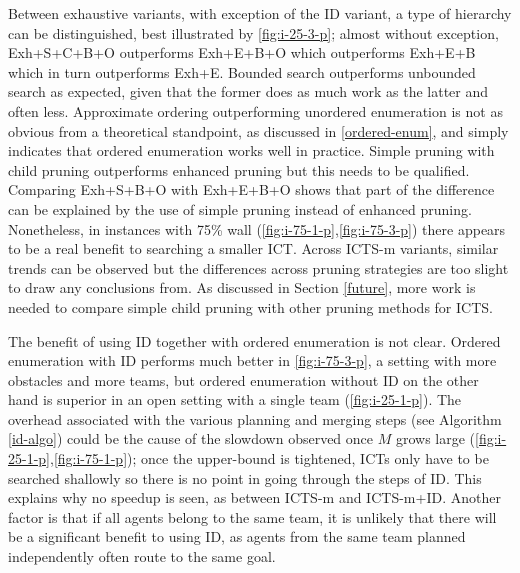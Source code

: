 \documentclass[english]{article}
\begin{document}
	Between exhaustive variants, with exception of the ID variant, a type of hierarchy can be distinguished, best illustrated by \ref{fig:i-25-3-p}; almost without exception, Exh+S+C+B+O outperforms Exh+E+B+O which outperforms Exh+E+B which in turn outperforms Exh+E. Bounded search outperforms unbounded search as expected, given that the former does as much work as the latter and often less. Approximate ordering outperforming unordered enumeration is not as obvious from a theoretical standpoint, as discussed in \ref{ordered-enum}, and simply indicates that ordered enumeration works well in practice. Simple pruning with child pruning outperforms enhanced pruning but this needs to be qualified. Comparing Exh+S+B+O with Exh+E+B+O shows that part of the difference can be explained by the use of simple pruning instead of enhanced pruning. Nonetheless, in instances with 75\% wall (\ref{fig:i-75-1-p},\ref{fig:i-75-3-p}) there appears to be a real benefit to searching a smaller ICT. Across ICTS-m variants, similar trends can be observed but the differences across pruning strategies are too slight to draw any conclusions from. As discussed in Section \ref{future}, more work is needed to compare simple child pruning with other pruning methods for ICTS.
	
	The benefit of using ID together with ordered enumeration is not clear. Ordered enumeration with ID performs much better in \ref{fig:i-75-3-p}, a setting with more obstacles and more teams, but ordered enumeration without ID on the other hand is superior in an open setting with a single team (\ref{fig:i-25-1-p}). The overhead associated with the various planning and merging steps (see Algorithm \ref{id-algo}) could be the cause of the slowdown observed once $M$ grows large (\ref{fig:i-25-1-p},\ref{fig:i-75-1-p}); once the upper-bound is tightened, ICTs only have to be searched shallowly so there is no point in going through the steps of ID. This explains why no speedup is seen, as between ICTS-m and ICTS-m+ID. Another factor is that if all agents belong to the same team, it is unlikely that there will be a significant benefit to using ID, as agents from the same team planned independently often route to the same goal.
	
\end{document}
